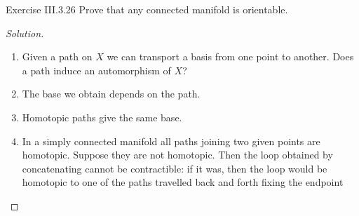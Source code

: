 \begin{thing4}{Exercise III.3.26}\label{exer:III.3.26}\leavevmode
Prove that any connected manifold is orientable.
\end{thing4}

\begin{proof}[Solution]\leavevmode
\begin{enumerate}[label=\textbf{Step \arabic*}]
\item Given a path on \(X\) we can transport a basis from one point to another. Does a path induce an automorphism of \(X\)?
\item The base we obtain depends on the path.
\item Homotopic paths give the same base.
\item In a simply connected manifold all paths joining two given points are homotopic. Suppose they are not homotopic. Then the loop obtained by concatenating cannot be contractible: if it was, then the loop would be homotopic to one of the paths travelled back and forth {\color{2}fixing the endpoint}
\end{enumerate}
\end{proof}















